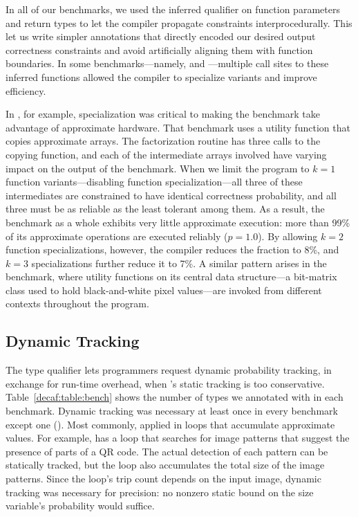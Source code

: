 In all of our benchmarks, we used the inferred  qualifier on
function parameters and return types to let the compiler propagate constraints
interprocedurally.
This let us write simpler annotations that directly encoded our desired output
correctness constraints and avoid artificially aligning them with function
boundaries.
In some benchmarks---namely,  and ---multiple call
sites to these inferred functions allowed the compiler to specialize variants
and improve efficiency.

In , for example, specialization was critical to making the
benchmark take advantage of approximate hardware.
That benchmark uses a utility function that copies approximate arrays.
The factorization routine has three calls to the copying function, and each of
the intermediate arrays involved have varying impact on the output of the
benchmark.
When we limit the program to $k=1$ function variants---disabling function
specialization---all three of these intermediates are constrained to
have identical correctness probability, and all three must be as reliable as
the least tolerant among them.
As a result, the benchmark as a whole exhibits very little approximate
execution: more than 99\% of its approximate operations are executed reliably
($p = 1.0$).
By allowing $k=2$ function specializations, however, the compiler reduces the
fraction to 8\%, and $k=3$ specializations further reduce it to 7\%.
A similar pattern arises in the  benchmark, where utility functions
on its central data structure---a bit-matrix class used to hold
black-and-white pixel values---are invoked from different contexts
throughout the program.


\subsection{Dynamic Tracking}

The  type qualifier lets programmers request dynamic
probability tracking, in exchange for run-time overhead, when \lang's static
tracking is too conservative.
Table~\ref{decaf:table:bench} shows the number of types we annotated with
 in each benchmark.
Dynamic tracking was necessary at least once in every benchmark except one
().
Most commonly,  applied in loops that accumulate approximate
values.
For example,  has a loop that searches for image patterns that
suggest the presence of parts of a QR code.
The actual detection of each pattern can be statically tracked, but the loop
also accumulates the total size of the image patterns.
Since the loop's trip count depends on the input image, dynamic tracking was
necessary for precision:
no nonzero static bound on the size variable's probability would suffice.

